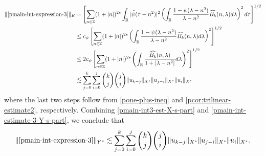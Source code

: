 \begin{equation}
  \label{pmain-int-estimate-3-Y-s-part}
  \begin{split}
    \|\eqref{pmain-int-expression-3}\|_{E}
    & = \left[ \sum_{n \in \mathbb{Z}} (1 + | n |)^{2s} \int_{\mathbb{R}} |
    \widehat{\psi}(\tau - n^{2}) |^{2} \left( \int_{\mathbb{R}}\frac{1 - \psi(\lambda -
    n^{2})}{\lambda - n^{2}} \widehat{{B_k}}(n, \lambda) d \lambda \right)^{2} d \tau
    \right]^{1/2}
    \\
    & \le c_{\psi} \left[ \sum_{n \in \mathbb{Z}} (1 + | n |)^{2s} \left(
    \int_{\mathbb{R}} \frac{1 - \psi(\lambda - n^{2})}{\lambda - n^{2}}
    \widehat{{B_k}}(n, \lambda) d \lambda
    \right)^{2}\right]^{1/2}
    \\
    & \le 2 c_{\psi} \left[ \sum_{n \in \mathbb{Z}} (1 + | n |)^{2s} \left(
    \int_{\mathbb{R}} \frac{\widehat{{B_k}}(n, \lambda) }{1 + |\lambda - n^{2}|}
    d \lambda
    \right)^{2}\right]^{1/2}
    \\
    & \lesssim 
    \sum_{j=0}^{k} \sum_{i=0}^{j} {k \choose j}{j \choose i}
    \|u_{k-j}\|_{X^s} \| u_{j-i}\|_{X^s}
    \| u_i \|_{X^s}
  \end{split}
\end{equation}
%
%
where the last two steps follow from \eqref{pone-plus-ineq} and
\cref{pcor:trilinear-estimate2}, respectively. Combining
\eqref{pmain-int3-est-X-s-part} and \eqref{pmain-int-estimate-3-Y-s-part}, we
conclude that
%
%
\begin{equation}
  \label{pmain-int3-est}
  \begin{split}
    \|\eqref{pmain-int-expression-3}\|_{Y^s} 
    \lesssim \sum_{j=0}^{k} \sum_{i=0}^{j} {k \choose j}{j \choose i}
    \|u_{k-j}\|_{X^s} \| u_{j-i}\|_{X^s}
    \| u_i \|_{X^s}.
  \end{split}
\end{equation}
%
%
%

